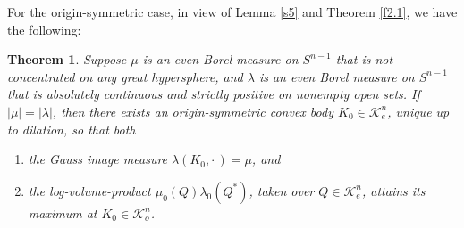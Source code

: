 \documentclass{cpamart1}     %
\newtheorem{theo}{Theorem}[section]
\newtheorem{coro}[theo]{Corollary}
\theoremstyle{definition}
\theoremstyle{remark}
\newcommand{\sn}{S^{n-1}}
\newcommand{\kno}{\mathcal K^n_o}
\newcommand{\balpha}{\pmb{\alpha}}
\begin{document}



For the origin-symmetric case, in view of Lemma \ref{s5} and Theorem \ref{f2.1},
we have the following:

\begin{theo}\label{f7}
Suppose $\mu$ is an even Borel measure on $\sn$ that is not concentrated
on any great hypersphere, and
$\lambda$ is an even Borel measure on $\sn$ that is absolutely continuous and strictly positive on nonempty open sets.
If $|\mu|=|\lambda|$, then there exists an origin-symmetric convex body
$K_0 \in \mathcal K_e^n$, unique up to dilation, so that both
\begin{enumerate}
\item the Gauss image measure
$\lambda(K_0,\cdot\,)=\mu$, and
\item the log-volume-product $\mu_0(Q)\lambda_0(Q^*)$, taken over $Q\in \mathcal K_e^n$,
attains its maximum at
$K_0\in\kno$.
\end{enumerate}
\end{theo}



        
\end{document}
